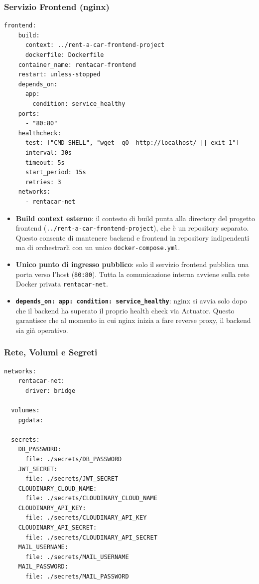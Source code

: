 \documentclass[12pt, a4paper]{article}
\begin{document}
    \subsubsection{Servizio Frontend (nginx)}

    \begin{lstlisting}[language={}, caption={docker-compose.yml — servizio frontend}]
  frontend:
    build:
      context: ../rent-a-car-frontend-project
      dockerfile: Dockerfile
    container_name: rentacar-frontend
    restart: unless-stopped
    depends_on:
      app:
        condition: service_healthy
    ports:
      - "80:80"
    healthcheck:
      test: ["CMD-SHELL", "wget -qO- http://localhost/ || exit 1"]
      interval: 30s
      timeout: 5s
      start_period: 15s
      retries: 3
    networks:
      - rentacar-net
    \end{lstlisting}

    \begin{itemize}
        \item \textbf{Build context esterno}: il contesto di build punta alla directory del
        progetto frontend (\texttt{../rent-a-car-frontend-project}), che è un repository
        separato. Questo consente di mantenere backend e frontend in repository indipendenti
        ma di orchestrarli con un unico \texttt{docker-compose.yml}.

        \item \textbf{Unico punto di ingresso pubblico}: solo il servizio frontend pubblica
        una porta verso l'host (\texttt{80:80}). Tutta la comunicazione interna avviene
        sulla rete Docker privata \texttt{rentacar-net}.

        \item \textbf{\texttt{depends\_on: app: condition: service\_healthy}}: nginx si
        avvia solo dopo che il backend ha superato il proprio health check via Actuator.
        Questo garantisce che al momento in cui nginx inizia a fare reverse proxy, il
        backend sia già operativo.
    \end{itemize}

    \subsubsection{Rete, Volumi e Segreti}

    \begin{lstlisting}[language={}, caption={docker-compose.yml — risorse condivise}]
  networks:
    rentacar-net:
      driver: bridge

  volumes:
    pgdata:

  secrets:
    DB_PASSWORD:
      file: ./secrets/DB_PASSWORD
    JWT_SECRET:
      file: ./secrets/JWT_SECRET
    CLOUDINARY_CLOUD_NAME:
      file: ./secrets/CLOUDINARY_CLOUD_NAME
    CLOUDINARY_API_KEY:
      file: ./secrets/CLOUDINARY_API_KEY
    CLOUDINARY_API_SECRET:
      file: ./secrets/CLOUDINARY_API_SECRET
    MAIL_USERNAME:
      file: ./secrets/MAIL_USERNAME
    MAIL_PASSWORD:
      file: ./secrets/MAIL_PASSWORD
    \end{lstlisting}
\end{document}
